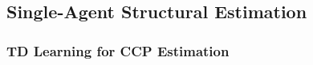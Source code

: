 



\subsection{Single-Agent Structural Estimation}

\subsubsection{TD Learning for CCP Estimation}

